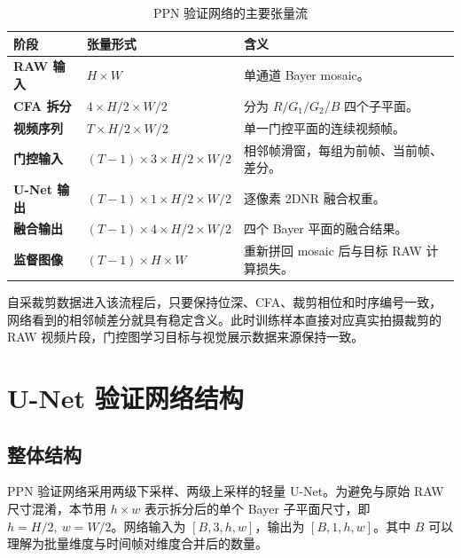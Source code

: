 \documentclass[UTF8,zihao=-4]{ctexart}
\begin{document}
\begin{table}[htbp]
\centering
\caption{PPN 验证网络的主要张量流}
\begin{tabularx}{\textwidth}{>{\bfseries}p{2.6cm} p{4.2cm} X}
\toprule
阶段 & 张量形式 & 含义 \\
\midrule
RAW 输入 & $H\times W$ & 单通道 Bayer mosaic。 \\
CFA 拆分 & $4\times H/2\times W/2$ & 分为 $R/G_1/G_2/B$ 四个子平面。 \\
视频序列 & $T\times H/2\times W/2$ & 单一门控平面的连续视频帧。 \\
门控输入 & $(T-1)\times3\times H/2\times W/2$ & 相邻帧滑窗，每组为前帧、当前帧、差分。 \\
U-Net 输出 & $(T-1)\times1\times H/2\times W/2$ & 逐像素 2DNR 融合权重。 \\
融合输出 & $(T-1)\times4\times H/2\times W/2$ & 四个 Bayer 平面的融合结果。 \\
监督图像 & $(T-1)\times H\times W$ & 重新拼回 mosaic 后与目标 RAW 计算损失。 \\
\bottomrule
\end{tabularx}
\end{table}

自采裁剪数据进入该流程后，只要保持位深、CFA、裁剪相位和时序编号一致，网络看到的相邻帧差分就具有稳定含义。此时训练样本直接对应真实拍摄裁剪的 RAW 视频片段，门控图学习目标与视觉展示数据来源保持一致。

\section{U-Net 验证网络结构}

\subsection{整体结构}

PPN 验证网络采用两级下采样、两级上采样的轻量 U-Net。为避免与原始 RAW 尺寸混淆，本节用 $h\times w$ 表示拆分后的单个 Bayer 子平面尺寸，即 $h=H/2,\ w=W/2$。网络输入为 $[B,3,h,w]$，输出为 $[B,1,h,w]$。其中 $B$ 可以理解为批量维度与时间帧对维度合并后的数量。
\end{document}
